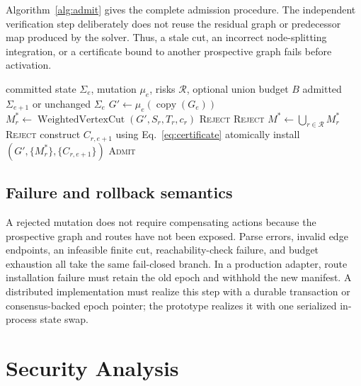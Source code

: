 \documentclass[10pt,journal,compsoc]{IEEEtran}
\begin{document}
Algorithm~\ref{alg:admit} gives the complete admission procedure.  The
independent verification step deliberately does not reuse the residual graph
or predecessor map produced by the solver.  Thus, a stale cut, an incorrect
node-splitting integration, or a certificate bound to another prospective
graph fails before activation.

\begin{algorithm}[t]
\caption{Transactional epoch admission}
\label{alg:admit}
\footnotesize
\begin{algorithmic}[1]
\Require committed state $\Sigma_e$, mutation $\mu_e$, risks $\mathcal R$,
optional union budget $B$
\Ensure admitted $\Sigma_{e+1}$ or unchanged $\Sigma_e$
\State $G'\gets\mu_e(\operatorname{copy}(G_e))$
  \State $M_r^*\gets\operatorname{WeightedVertexCut}(G',S_r,T_r,c_r)$
    \State \Return \textsc{Reject}
  \EndIf
    \State \Return \textsc{Reject}
  \EndIf
\EndFor
\State $M^*\gets\bigcup_{r\in\mathcal R}M_r^*$
  \State \Return \textsc{Reject}
\EndIf
{}
  \State construct $C_{r,e+1}$ using Eq.~\eqref{eq:certificate}
\EndFor
\State atomically install $(G',\{M_r^*\},\{C_{r,e+1}\})$
\State \Return \textsc{Admit}
\end{algorithmic}
\end{algorithm}

\subsection{Failure and rollback semantics}

A rejected mutation does not require compensating actions because the
prospective graph and routes have not been exposed.  Parse errors, invalid edge
endpoints, an infeasible finite cut, reachability-check failure, and budget
exhaustion all take the same fail-closed branch.  In a production adapter, route
installation failure must retain the old epoch and withhold the new manifest.
A distributed implementation must realize this step with a durable transaction
or consensus-backed epoch pointer; the prototype realizes it with one
serialized in-process state swap.

\section{Security Analysis}
\end{document}
